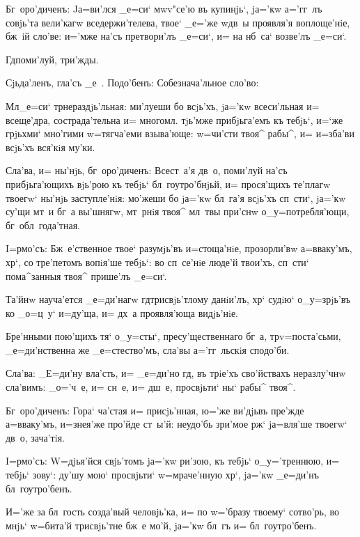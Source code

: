 Бг~оро'диченъ: Jа=ви'лся _е=си` мwv"се'ю въ купинjь`, 
jа='кw а='гг~лъ совjь'та вели'кагw вседержи'телева, твое` 
_е='же w\т дв~ы проявля'я воплоще'нiе, бж~iй сло'ве: 
и='мже на'съ претвори'лъ _е=си`, и= на нб~са` возве'лъ 
_е=си`.

 Гд поми'луй, три'жды.

Сjьда'ленъ, гла'съ _е~. Подо'бенъ: Собезнача'льное 
сло'во:

Мл _е=си` тр нераздjь'льная: ми'луеши бо 
всjь'хъ, jа='кw всеси'льная и= всеще'дра, сострада'тельна 
и= многомл. тjь'мже прибjьга'емъ къ тебjь`, и=`же 
грjьхми` мно'гими w=тягча'еми взыва'юще: w=чи'сти твоя^ 
рабы^, и= и=зба'ви всjь'хъ вся'кiя му'ки.

Сла'ва, и= ны'нjь, бг~оро'диченъ: Всест~а'я дв~о, 
поми'луй на'съ прибjьга'ющихъ вjь'рою къ тебjь` 
бл~гоутро'бнjьй, и= прося'щихъ те'плагw твоегw` ны'нjь 
заступле'нiя: мо'жеши бо jа='кw бл~га'я всjь'хъ сп~сти`, 
jа='кw су'щи мт~и бг~а вы'шнягw, мт~рнiя твоя^ мл~твы 
при'снw о_у=потребля'ющи, бг~обл~года'тная.


I=рмо'съ: Бж~е'ственное твое` разумjь'въ и=стоща'нiе, 
прозорли'вw а=вваку'мъ, хр`, со тре'петомъ вопiя'ше 
тебjь`: во сп~се'нiе люде'й твои'хъ, сп~сти` пома^занныя 
твоя^ прише'лъ _е=си`.

Та'йнw науча'ется _е=ди'нагw гд трисвjь'тлому 
данiи'лъ, хр` судiю` о_у=зрjь'въ ко _о=ц~у` и=ду'ща, 
и= дх~а проявля'юща видjь'нiе. 

Бре'нными пою'щихъ тя` о_у=сты`, пресу'щественнаго 
бг~а, тр v=поста'сьми, _е=ди'нственна же 
_е=стество'мъ, сла'вы а='гг~льскiя сподо'би.

Сла'ва: _Е=ди'ну вла'сть, и= _е=ди'но гд, въ 
трiе'хъ сво'йствахъ неразлу'чнw сла'вимъ: _о='ч~е, и= 
сн~е, и= дш~е, просвjьти` ны` рабы^ твоя^.

Бг~оро'диченъ: Гора` ча'стая и= присjь'нная, ю='же 
ви'дjьвъ пре'жде а=вваку'мъ, и=з\ъ нея'же про'йде ст~ы'й: 
неудо'бь зри'мое рж` jа=вля'ше твоегw` дв~о, 
зача'тiя. 


I=рмо'съ: W=дjья'йся свjь'томъ jа='кw ри'зою, къ 
тебjь` о_у='треннюю, и= тебjь` зову`: ду'шу мою` 
просвjьти` w=мраче'нную хр`, jа='кw _е=ди'нъ 
бл~гоутро'бенъ.

И='же за бл~гость созда'вый человjь'ка, и= по w='бразу 
твоему` сотво'рь, во мнjь` w=бита'й трисвjь'тне бж~е 
мо'й, jа='кw бл~гъ и= бл~гоутро'бенъ.

